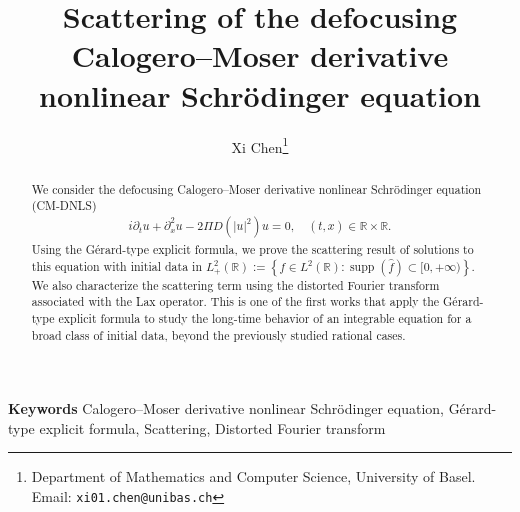 \documentclass[10pt]{article}
\title{\textbf{Scattering of the defocusing Calogero--Moser derivative nonlinear Schrödinger equation}}
\date{}
\author{Xi Chen\thanks{Department of Mathematics and Computer Science, University of Basel. \\ \hspace*{5.5mm}  Email: \texttt{xi01.chen@unibas.ch}}}
\numberwithin{equation}{section}
\numberwithin{theorem}{section}
\providecommand{\keywords}[1]
{
  \small	
  \textbf{Keywords } #1
}
\begin{document}
\maketitle
\begin{abstract}
We consider the defocusing Calogero–Moser derivative nonlinear Schrödinger equation (CM-DNLS)
\begin{align*}
i \partial_{t} u+\partial_{x}^2 u-2\Pi D\left(|u|^{2}\right)u=0, \quad (t,x ) \in \mathbb{R} \times \mathbb{R}.
\end{align*}
Using the Gérard-type explicit formula, we prove the scattering result of solutions to this equation with initial data in $L_{+}^2(\mathbb{R}):=\left\{f \in L^2(\mathbb{R}): \operatorname{supp}(\widehat{f}) \subset[0,+\infty)\right\}$. We also characterize the scattering term using the distorted Fourier transform associated with the Lax operator. This is one of the first works that apply the Gérard-type explicit formula to study the long-time behavior of an integrable equation for a broad class of initial data, beyond the previously studied rational cases.
\end{abstract}
\keywords{Calogero–Moser derivative nonlinear Schrödinger equation, Gérard-type explicit formula, Scattering, Distorted Fourier transform}\\

\tableofcontents{}
\end{document}
